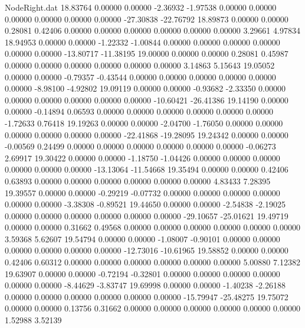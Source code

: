 \begin{filecontents}{NodeRight.dat}
  18.83764    0.00000    0.00000    -2.36932   -1.97538    0.00000    0.00000    0.00000    0.00000    0.00000    0.00000  -27.30838  -22.76792
  18.89873    0.00000    0.00000     0.28081    0.42406    0.00000    0.00000    0.00000    0.00000    0.00000    0.00000    3.29661    4.97834
  18.94953    0.00000    0.00000    -1.22332   -1.00844    0.00000    0.00000    0.00000    0.00000    0.00000    0.00000  -13.80717  -11.38195
  19.00000    0.00000    0.00000     0.28081    0.45987    0.00000    0.00000    0.00000    0.00000    0.00000    0.00000    3.14863    5.15643
  19.05052    0.00000    0.00000    -0.79357   -0.43544    0.00000    0.00000    0.00000    0.00000    0.00000    0.00000   -8.98100   -4.92802
  19.09119    0.00000    0.00000    -0.93682   -2.33350    0.00000    0.00000    0.00000    0.00000    0.00000    0.00000  -10.60421  -26.41386
  19.14190    0.00000    0.00000    -0.14894    0.06593    0.00000    0.00000    0.00000    0.00000    0.00000    0.00000   -1.72633    0.76418
  19.19263    0.00000    0.00000    -2.04700   -1.76050    0.00000    0.00000    0.00000    0.00000    0.00000    0.00000  -22.41868  -19.28095
  19.24342    0.00000    0.00000    -0.00569    0.24499    0.00000    0.00000    0.00000    0.00000    0.00000    0.00000   -0.06273    2.69917
  19.30422    0.00000    0.00000    -1.18750   -1.04426    0.00000    0.00000    0.00000    0.00000    0.00000    0.00000  -13.13064  -11.54668
  19.35494    0.00000    0.00000     0.42406    0.63893    0.00000    0.00000    0.00000    0.00000    0.00000    0.00000    4.83433    7.28395
  19.39557    0.00000    0.00000    -0.29219   -0.07732    0.00000    0.00000    0.00000    0.00000    0.00000    0.00000   -3.38308   -0.89521
  19.44650    0.00000    0.00000    -2.54838   -2.19025    0.00000    0.00000    0.00000    0.00000    0.00000    0.00000  -29.10657  -25.01621
  19.49719    0.00000    0.00000     0.31662    0.49568    0.00000    0.00000    0.00000    0.00000    0.00000    0.00000    3.59368    5.62607
  19.54794    0.00000    0.00000    -1.08007   -0.90101    0.00000    0.00000    0.00000    0.00000    0.00000    0.00000  -12.73016  -10.61965
  19.58852    0.00000    0.00000     0.42406    0.60312    0.00000    0.00000    0.00000    0.00000    0.00000    0.00000    5.00880    7.12382
  19.63907    0.00000    0.00000    -0.72194   -0.32801    0.00000    0.00000    0.00000    0.00000    0.00000    0.00000   -8.44629   -3.83747
  19.69998    0.00000    0.00000    -1.40238   -2.26188    0.00000    0.00000    0.00000    0.00000    0.00000    0.00000  -15.79947  -25.48275
  19.75072    0.00000    0.00000     0.13756    0.31662    0.00000    0.00000    0.00000    0.00000    0.00000    0.00000    1.52988    3.52139

\end{filecontents}

